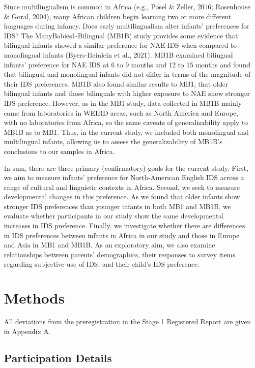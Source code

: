 \documentclass[
  ,man,floatsintext]{apa6}
\begin{document}
Since multilingualism is common in Africa (e.g., Posel \& Zeller, 2016; Rosenhouse \& Goral, 2004), many African children begin learning two or more different languages during infancy. Does early multilingualism alter infants' preferences for IDS? The ManyBabies1-Bilingual (MB1B) study provides some evidence that bilingual infants showed a similar preference for NAE IDS when compared to monolingual infants (Byers-Heinlein et al., 2021). MB1B examined bilingual infants' preference for NAE IDS at 6 to 9 months and 12 to 15 months and found that bilingual and monolingual infants did not differ in terms of the magnitude of their IDS preferences. MB1B also found similar results to MB1, that older bilingual infants and those bilinguals with higher exposure to NAE show stronger IDS preference. However, as in the MB1 study, data collected in MB1B mainly came from laboratories in WEIRD areas, such as North America and Europe, with no laboratories from Africa, so the same caveats of generalizability apply to MB1B as to MB1. Thus, in the current study, we included both monolingual and multilingual infants, allowing us to assess the generalizability of MB1B's conclusions to our samples in Africa.

In sum, there are three primary (confirmatory) goals for the current study. First, we aim to measure infants' preference for North-American English IDS across a range of cultural and linguistic contexts in Africa. Second, we seek to measure developmental changes in this preference. As we found that older infants show stronger IDS preferences than younger infants in both MB1 and MB1B, we evaluate whether participants in our study show the same developmental increases in IDS preference. Finally, we investigate whether there are differences in IDS preferences between infants in Africa in our study and those in Europe and Asia in MB1 and MB1B. As an exploratory aim, we also examine relationships between parents' demographics, their responses to survey items regarding subjective use of IDS, and their child's IDS preference.

\hypertarget{methods}{%
\section{Methods}\label{methods}}

All deviations from the preregistration in the Stage 1 Registered Report are given in Appendix A.

\hypertarget{participation-details}{%
\subsection{Participation Details}\label{participation-details}}
\end{document}
